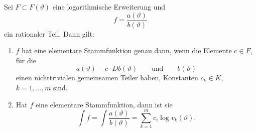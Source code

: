 \begin{satz}
\label{buch:intalg:risch:satz:rothstein-trager-logarithmisch}
Sei $F\subset F(\vartheta)$ eine logarithmische Erweiterung und 
\[
f = \frac{a(\vartheta)}{b(\vartheta)}
\]
ein rationaler Teil.
Dann gilt:
\begin{enumerate}
\item
$f$ hat eine elementare Stammfunktion genau dann, wenn die 
Elemente $c\in F$, für die 
\[
a(\vartheta) - c \cdot Db(\vartheta)
\qquad\text{und}\qquad
b(\vartheta)
\]
einen nichttrivialen gemeinsamen Teiler haben, Konstanten $c_k\in K$,
$k=1,\dots,m$ sind.
\item
Hat $f$ eine elementare Stammfunktion, dann ist sie
\begin{equation}
\int f
=
\int \frac{a(\vartheta)}{b(\vartheta)}
=
\sum_{k=1}^m c_i \log v_k(\vartheta).
\label{buch:intalg:risch:satz:rtlog:summe}
\end{equation}
\end{enumerate}
\end{satz}

